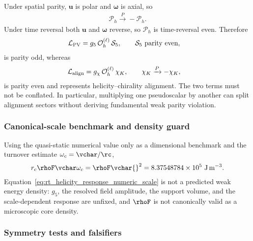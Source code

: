 Under spatial parity, \(\mathbf u\) is polar and
\(\boldsymbol\omega\) is axial, so
\begin{align}
    \mathcal P_h\xrightarrow{P}-\mathcal P_h.
\end{align}
Under time reversal both \(\mathbf u\) and \(\boldsymbol\omega\) reverse, so
\(\mathcal P_h\) is time-reversal even.  Therefore
\begin{align}
    \mathcal L_{\rm PV}
    &=g_5\,\mathcal O_h^{(\ell)}\,\mathcal S_5,
    \qquad \mathcal S_5\ \text{parity even},
    \label{eq:rt_parity_odd_response_term}
\end{align}
is parity odd, whereas
\begin{align}
    \mathcal L_{\rm align}
    &=g_\chi\,\mathcal O_h^{(\ell)}\,\chi_K,
    \qquad \chi_K\xrightarrow{P}-\chi_K,
    \label{eq:rt_chiral_alignment_term}
\end{align}
is parity even and represents helicity--chirality alignment.  The two terms must
not be conflated.  In particular, multiplying one pseudoscalar by another can
split alignment sectors without deriving fundamental weak parity violation.

\subsubsection{Canonical-scale benchmark and density guard}

Using the quasi-static numerical value only as a dimensional benchmark and the
turnover estimate \(\omega_c=\vchar/\rc\),
\begin{align}
    r_c\rhoF\vchar\omega_c
    =
    \rhoF\vchar{}^2
    =
    8.37548784\times10^5\ \mathrm{J\,m^{-3}}.
    \label{eq:rt_helicity_response_numeric_scale}
\end{align}
Equation~\eqref{eq:rt_helicity_response_numeric_scale} is not a predicted weak
energy density: \(g_5\), the resolved field amplitude, the support volume, and
the scale-dependent response are unfixed, and \(\rhoF\) is not canonically valid
as a microscopic core density.

\subsubsection{Symmetry tests and falsifiers}

